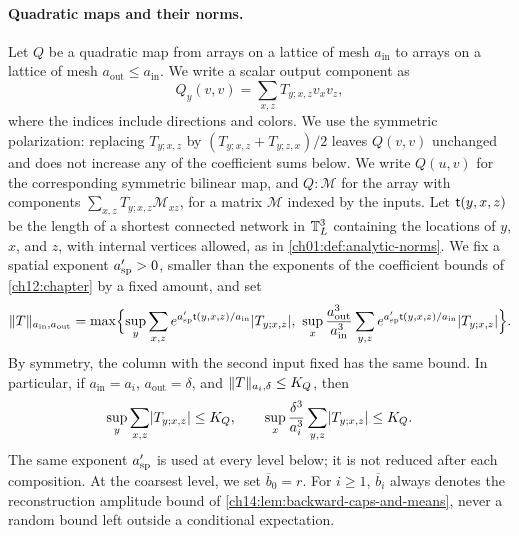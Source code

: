 \paragraph{Quadratic maps and their norms.}
Let $Q$ be a quadratic map from arrays on a lattice of mesh $a_{\mathrm{in}}$ to arrays on a lattice of mesh $a_{\mathrm{out}}\le a_{\mathrm{in}}$. We write a scalar output component as
\[
 Q_y(v,v)=\sum_{x,z}T_{y;x,z}v_xv_z,
\]
where the indices include directions and colors. We use the symmetric polarization: replacing $T_{y;x,z}$ by $(T_{y;x,z}+T_{y;z,x})/2$ leaves $Q(v,v)$ unchanged and does not increase any of the coefficient sums below. We write $Q(u,v)$ for the corresponding symmetric bilinear map, and $Q:\mathcal M$ for the array with components $\sum_{x,z}T_{y;x,z}\mathcal M_{xz}$, for a matrix $\mathcal M$ indexed by the inputs. Let $\mathsf t(y,x,z)$ be the length of a shortest connected network in $\mathbb T_L^3$ containing the locations of $y$, $x$, and $z$, with internal vertices allowed, as in \cref{ch01:def:analytic-norms}. We fix a spatial exponent $a_{\mathrm{sp}}'>0$, smaller than the exponents of the coefficient bounds of \cref{ch12:chapter} by a fixed amount, and set
\begin{equation}\label{ch14:eq:weighted-quadratic-norm}
 \norm T_{a_{\mathrm{in}},a_{\mathrm{out}}}=\max\Bigl\{\sup_y\sum_{x,z}e^{\asp'\Tree(y,x,z)/a_{\mathrm{in}}}\abs{T_{y;x,z}},\ \sup_x\frac{a_{\mathrm{out}}^3}{a_{\mathrm{in}}^3}\sum_{y,z}e^{\asp'\Tree(y,x,z)/a_{\mathrm{in}}}\abs{T_{y;x,z}}\Bigr\}.
\end{equation}
By symmetry, the column with the second input fixed has the same bound. In particular, if $a_{\mathrm{in}}=a_i$, $a_{\mathrm{out}}=\delta$, and $\lVert T\rVert_{a_i,\delta}\le K_Q$, then
\begin{equation}\label{ch14:eq:quadratic-norm}
 \sup_y\sum_{x,z}\lvert T_{y;x,z}\rvert\le K_Q,\qquad\sup_x\frac{\delta^3}{a_i^3}\sum_{y,z}\lvert T_{y;x,z}\rvert\le K_Q.
\end{equation}
The same exponent $a_{\mathrm{sp}}'$ is used at every level below; it is not reduced after each composition. At the coarsest level, we set $\overline b_0=r$. For $i\ge1$, $\overline b_i$ always denotes the reconstruction amplitude bound of \cref{ch14:lem:backward-caps-and-means}, never a random bound left outside a conditional expectation.

